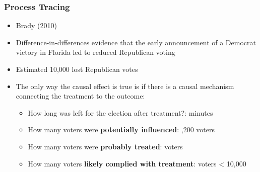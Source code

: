 \documentclass[xcolor=x11names,compress]{beamer}\usepackage[]{graphicx}\usepackage[]{color}
\renewcommand{\(}{\begin{columns}}
\renewcommand{\)}{\end{columns}}
\newcommand{\<}[1]{\begin{column}{#1}}
\renewcommand{\>}{\end{column}}
\begin{document}

\begin{frame}
\frametitle{Process Tracing}
\begin{itemize}
\item Brady (2010)
\pause
\item Difference-in-differences evidence that the early announcement of a Democrat victory in Florida led to reduced Republican voting
\pause
\item Estimated 10,000 lost Republican votes
\pause
\item The only way the causal effect is true is if there is a causal mechanism connecting the treatment to the outcome:
\pause
\begin{itemize}
\item How long was left for the election after treatment?:  minutes
\pause
\item How many voters were \textbf{potentially influenced}: ,200 voters
\pause
\item How many voters were \textbf{probably treated}:  voters
\pause
\item How many voters \textbf{likely complied with treatment}:  voters \pause < 10,000
\end{itemize}
\end{itemize}
\end{frame}
\end{document}
